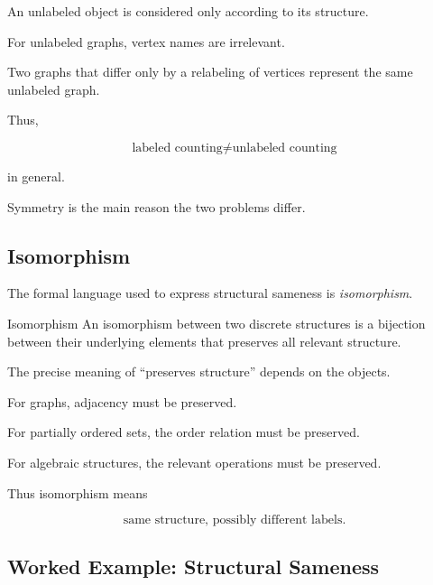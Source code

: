 An unlabeled object is considered only according to its structure.

For unlabeled graphs, vertex names are irrelevant.

Two graphs that differ only by a relabeling of vertices represent the
same unlabeled graph.

Thus,

\[
\boxed{
\text{labeled counting}
\neq
\text{unlabeled counting}
}
\]

in general.

Symmetry is the main reason the two problems differ.

\subsection{Isomorphism}
\label{subsec:discrete-isomorphism}

The formal language used to express structural sameness is
\emph{isomorphism}.

\begin{definitionbox}{Isomorphism}
An isomorphism between two discrete structures is a bijection between
their underlying elements that preserves all relevant structure.
\end{definitionbox}

The precise meaning of ``preserves structure'' depends on the objects.

For graphs, adjacency must be preserved.

For partially ordered sets, the order relation must be preserved.

For algebraic structures, the relevant operations must be preserved.

Thus isomorphism means

\[
\boxed{
\text{same structure, possibly different labels}.
}
\]

\subsection{Worked Example: Structural Sameness}
\label{subsec:worked-isomorphism-discrete}

